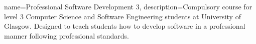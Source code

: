 \usepackage{glossaries}
\makeglossaries


{
  name=Professional Software Development 3,
  description={Compulsory course for level 3 Computer Science and
    Software Engineering students at University of Glasgow. Designed
    to teach students how to develop software in a professional manner
    following professional standards.}
}